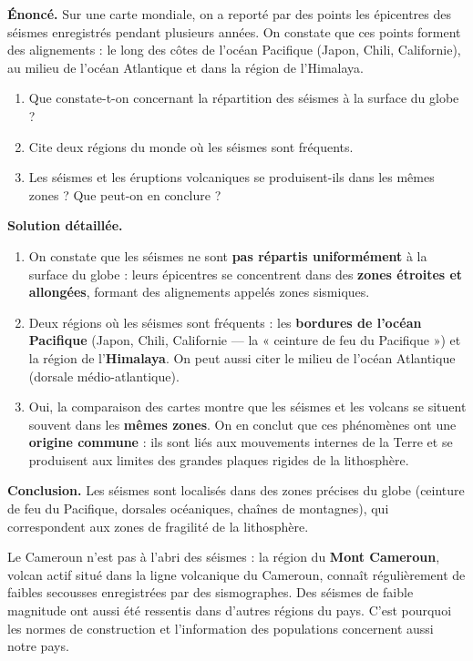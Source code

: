 \documentclass[11pt]{article}
\newcommand{\cle}[1]{{\popxbold\color{popdark}#1}}
\begin{document}
\begin{exoresolu}
\textbf{Énoncé.} Sur une carte mondiale, on a reporté par des points les épicentres des séismes enregistrés pendant plusieurs années. On constate que ces points forment des alignements : le long des côtes de l'océan Pacifique (Japon, Chili, Californie), au milieu de l'océan Atlantique et dans la région de l'Himalaya.
\begin{enumerate}
\item Que constate-t-on concernant la répartition des séismes à la surface du globe ?
\item Cite deux régions du monde où les séismes sont fréquents.
\item Les séismes et les éruptions volcaniques se produisent-ils dans les mêmes zones ? Que peut-on en conclure ?
\end{enumerate}
\tcblower
\textbf{Solution détaillée.}
\begin{enumerate}
\item On constate que les séismes ne sont \textbf{pas répartis uniformément} à la surface du globe : leurs épicentres se concentrent dans des \textbf{zones étroites et allongées}, formant des alignements appelés \cle{zones sismiques}.
\item Deux régions où les séismes sont fréquents : les \textbf{bordures de l'océan Pacifique} (Japon, Chili, Californie — la « ceinture de feu du Pacifique ») et la région de l'\textbf{Himalaya}. On peut aussi citer le milieu de l'océan Atlantique (dorsale médio-atlantique).
\item Oui, la comparaison des cartes montre que les séismes et les volcans se situent souvent dans les \textbf{mêmes zones}. On en conclut que ces phénomènes ont une \textbf{origine commune} : ils sont liés aux mouvements internes de la Terre et se produisent aux limites des grandes plaques rigides de la lithosphère.
\end{enumerate}
\textbf{Conclusion.} Les séismes sont localisés dans des zones précises du globe (ceinture de feu du Pacifique, dorsales océaniques, chaînes de montagnes), qui correspondent aux zones de fragilité de la lithosphère.
\end{exoresolu}

\begin{savaistu}[Et au Cameroun ?]
Le Cameroun n'est pas à l'abri des séismes : la région du \textbf{Mont Cameroun}, volcan actif situé dans la ligne volcanique du Cameroun, connaît régulièrement de faibles secousses enregistrées par des sismographes. Des séismes de faible magnitude ont aussi été ressentis dans d'autres régions du pays. C'est pourquoi les normes de construction et l'information des populations concernent aussi notre pays.
\end{savaistu}
\end{document}
